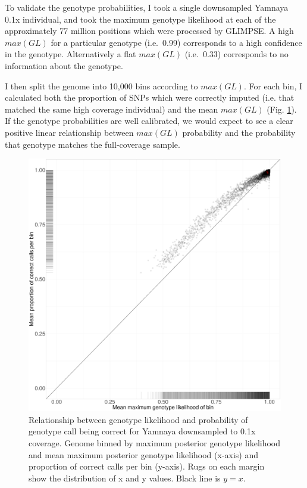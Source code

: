 To validate the genotype probabilities, I took a single downsampled Yamnaya 0.1x individual, and took the maximum genotype likelihood at each of the approximately 77 million positions which were processed by GLIMPSE. A high $max(GL)$ for a particular genotype (i.e.\ 0.99) corresponds to a high confidence in the genotype. Alternatively a flat $max(GL)$ (i.e.\ 0.33) corresponds to no information about the genotype. 

I then split the genome into 10,000 bins according to $max(GL)$. For each bin, I calculated both the proportion of SNPs which were correctly imputed (i.e. that matched the same high coverage individual) and the mean $max(GL)$ (Fig. \ref{fig:Yamnaya_0.1x_GL_calibration}). If the genotype probabilities are well calibrated, we would expect to see a clear positive linear relationship between $max(GL)$ probability and the probability that genotype matches the full-coverage sample.  

\begin{figure}[htp]
    \centering
    \includegraphics[width=1.0\textwidth]{../images/chapter1/Yamnaya_0.1x_bin.pdf}
    \caption{Relationship between genotype likelihood and probability of genotype call being correct for Yamnaya downsampled to 0.1x coverage. Genome binned by maximum posterior genotype likelihood and mean maximum posterior genotype likelihood (x-axis) and proportion of correct calls per bin (y-axis). Rugs on each margin show the distribution of x and y values. Black line is $y=x$.}
    \label{fig:Yamnaya_0.1x_GL_calibration}
\end{figure}

